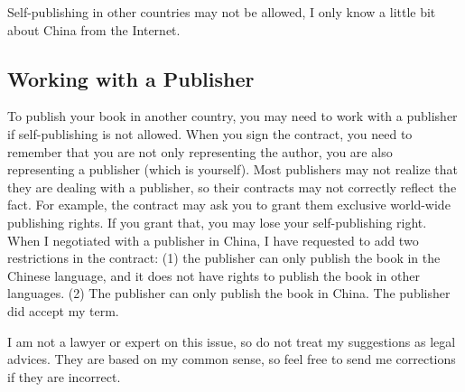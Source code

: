 Self-publishing in other countries may not be allowed, 
I only know a little bit about China from the Internet.



\subsection{Working with a Publisher}

To publish your book in another country, you may need to work
with a publisher if self-publishing is not allowed. When you sign
the contract, you need to remember that you are not only representing the author, 
you are also representing a
publisher (which is yourself). Most publishers may not realize that they 
are dealing with a publisher, so their contracts may not correctly reflect the fact. 
For example, the contract may ask you to grant them exclusive world-wide publishing rights. 
If you grant that, you may lose your self-publishing right.  
When I negotiated with a publisher in China, I have requested to add two restrictions in the 
contract: (1) the publisher can only publish the book in the Chinese language, 
and it does not have rights to publish the book in other languages. 
(2) The publisher can only publish the book in China. 
The publisher did accept my term. 


I am not a lawyer or expert on this issue, so do not treat my suggestions as 
legal advices. They are based on my common sense, so 
feel free to send me corrections if they are incorrect. 





